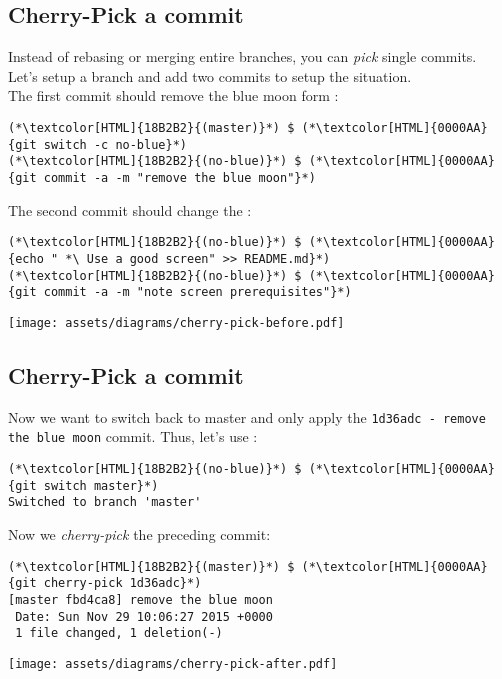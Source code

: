 \subsection{Cherry-Pick a commit}
\begin{frame}[fragile]
  \subslidetitle
  Instead of rebasing or merging entire branches, you can \textit{pick} single commits. \\

  Let's setup a branch and add two commits to setup the situation. \\
  \vspace{1em}
  The first commit should remove the blue moon form : \\
  \begin{lstlisting}
(*\textcolor[HTML]{18B2B2}{(master)}*) $ (*\textcolor[HTML]{0000AA}{git switch -c no-blue}*)
(*\textcolor[HTML]{18B2B2}{(no-blue)}*) $ (*\textcolor[HTML]{0000AA}{git commit -a -m "remove the blue moon"}*)
\end{lstlisting}

  The second commit should change the :\\
  \begin{lstlisting}
(*\textcolor[HTML]{18B2B2}{(no-blue)}*) $ (*\textcolor[HTML]{0000AA}{echo " *\ Use a good screen" >> README.md}*)
(*\textcolor[HTML]{18B2B2}{(no-blue)}*) $ (*\textcolor[HTML]{0000AA}{git commit -a -m "note screen prerequisites"}*)
\end{lstlisting}
  \vspace{1em}
  \centerline{\texttt{[image: assets/diagrams/cherry-pick-before.pdf]}}
\end{frame}

\subsection{Cherry-Pick a commit}
\begin{frame}[fragile]
  \subslidetitle
    Now we want to switch back to master and only apply the \lstinline{1d36adc - remove the blue moon} commit.
    Thus, let's use :
  \begin{lstlisting}
(*\textcolor[HTML]{18B2B2}{(no-blue)}*) $ (*\textcolor[HTML]{0000AA}{git switch master}*)
Switched to branch 'master'
\end{lstlisting}

  Now we \textit{cherry-pick} the preceding commit:
  \begin{lstlisting}
(*\textcolor[HTML]{18B2B2}{(master)}*) $ (*\textcolor[HTML]{0000AA}{git cherry-pick 1d36adc}*)
[master fbd4ca8] remove the blue moon
 Date: Sun Nov 29 10:06:27 2015 +0000
 1 file changed, 1 deletion(-)
\end{lstlisting}

  \vspace{1em}

  \centerline{\texttt{[image: assets/diagrams/cherry-pick-after.pdf]}}
\end{frame}

